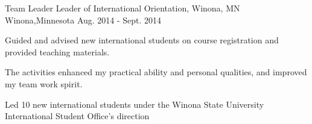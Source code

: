 

\begin{cventries}

  \cventry
    {Team Leader} %
    {Leader of International Orientation, Winona, MN} %
    {Winona,Minnesota} %
    {Aug. 2014 - Sept. 2014 } %
    {
      \begin{cvitems} %
        \item {Guided and advised new international students on course registration and 
 provided teaching materials.}
        \item {The activities enhanced my practical ability and personal qualities, and improved my team work spirit.}
        \item {Led 10 new international students under the Winona State University International 
 Student Office’s direction}
        \end{cvitems}
    }
    
\end{cventries}
